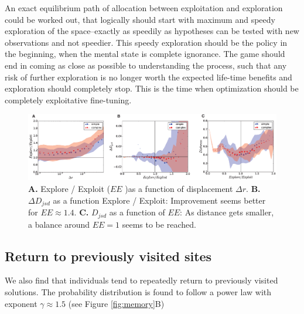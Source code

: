 An exact equilibrium path of allocation between exploitation and exploration could be worked out, that logically should start with maximum and speedy exploration of the space--exactly as speedily as hypotheses can be tested with new observations and not speedier.  This speedy exploration should be the policy in the beginning, when the mental state is complete ignorance.  The game should end in coming as close as possible to understanding the process, such that any risk of further exploration is no longer worth the expected life-time benefits and exploration should completely stop. This is the time when optimization should be completely exploitative fine-tuning.    
 



\begin{figure}[h!]
\begin{center}
\includegraphics[width=18cm]{figures/EE.eps}
\caption{{\bf A.} Explore / Exploit ($EE$ )as a function of displacement $\Delta r$. {\bf B.} $\Delta D_{jsd}$ as a function Explore / Exploit: Improvement seems better for $EE \approx 1.4$. {\bf C.} $D_{jsd}$ as a function of $EE$: As distance gets smaller, a balance around $EE = 1$ seems to be reached.}
\label{fig:pdf_return}
\end{center}
\end{figure}

\subsection{Return to previously visited sites}
We also find that individuals tend to repeatedly return to previously visited solutions. The probability distribution is found to follow a power law with exponent $\gamma \approx 1.5$  (see Figure \ref{fig:memory}B)

